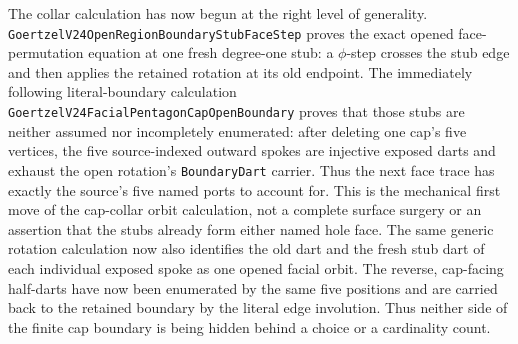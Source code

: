 \documentclass[11pt]{article}
\theoremstyle{definition}
\begin{document}
The collar calculation has now begun at the right level of generality.
\texttt{GoertzelV24OpenRegionBoundaryStubFaceStep} proves the exact opened
face-permutation equation at one fresh degree-one stub: a \(\phi\)-step crosses
the stub edge and then applies the retained rotation at its old endpoint.
The immediately following literal-boundary calculation
\texttt{GoertzelV24FacialPentagonCapOpenBoundary} proves that those stubs are
neither assumed nor incompletely enumerated: after deleting one cap's five
vertices, the five source-indexed outward spokes are injective exposed darts
and exhaust the open rotation's \texttt{BoundaryDart} carrier.  Thus the next
face trace has exactly the source's five named ports to account for.  This is
the mechanical first move of the cap-collar orbit calculation, not a complete
surface surgery or an assertion that the stubs already form either named hole
face.  The same generic rotation calculation now also identifies the old dart
and the fresh stub dart of each individual exposed spoke as one opened facial
orbit.  The reverse, cap-facing half-darts have now been enumerated by the same
five positions and are carried back to the retained boundary by the literal
edge involution.  Thus neither side of the finite cap boundary is being hidden
behind a choice or a cardinality count.
\end{document}
